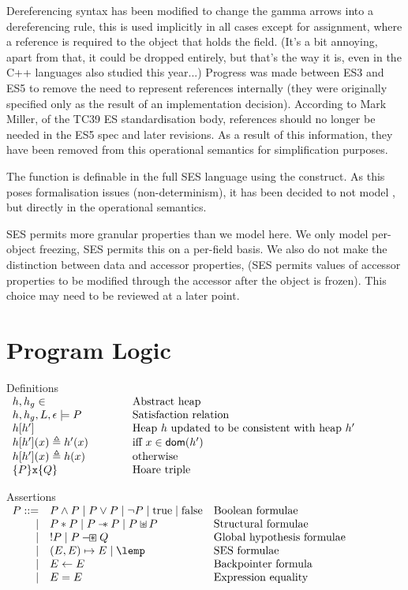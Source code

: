 \documentclass[a4paper]{article}
\begin{document}
Dereferencing syntax has been modified to change the gamma arrows into a
dereferencing rule, this is used implicitly in all cases except for assignment,
where a reference is required to the object that holds the field. (It's a bit
annoying, apart from that, it could be dropped entirely, but that's the way it
is, even in the C++ languages also studied this year...)
Progress was
made between ES3 and ES5 to remove the need to represent references internally
(they were originally specified only as the result of an implementation
decision). According to Mark Miller, of the TC39 ES standardisation body,
references should no longer be needed in the ES5 spec and later revisions. As a
result of this information, they have been removed from this operational
semantics for simplification purposes.

The  function is definable in the full SES language using the
 construct. As this poses formalisation issues (non-determinism),
it has been decided to not model , but  directly in the
operational semantics.

SES permits more granular properties than we model here. We only model
per-object freezing, SES permits this on a per-field basis. We also do not make
the distinction between data and accessor properties, (SES permits values of
accessor properties to be modified through the accessor after the object is
frozen). This choice may need to be reviewed at a later point.

\section{Program Logic}

\newcommand{\defline}[2]{#1 & \qquad & \text{#2}\\}
\begin{display}{Definitions}
  $\begin{array}{lll}
    \defline{h,h_g \in}{Abstract heap}
    \defline{h,h_g,L,\env \satisfies P}{Satisfaction relation}
    \defline{h[h']}{Heap $h$ updated to be consistent with heap $h'$}
    \defline{h[h'](x) \triangleq h'(x)}{iff $x \in \dom(h')$}
    \defline{h[h'](x) \triangleq h(x)}{otherwise}
    \defline{\tr{P}{\js{x}}{Q}}{Hoare triple}
  \end{array}$
\end{display}

\newcommand{\asrtline}[3][\pipe]{#1 & #2 & \text{#3}\\}
\begin{display}{Assertions}
  $\begin{array}{rll}
    \asrtline[P ::=]{P \land P \pipe P \lor P \pipe \lnot P \pipe \true \pipe
    \false}{Boolean formulae}
    \asrtline{P \sep P \pipe P \wand P \pipe P \sepish P}{Structural formulae}
    \asrtline{\upd P \pipe P \boxwand Q}{Global hypothesis formulae}
    \asrtline{(E,E) \pointsto E \pipe \lemp}{SES formulae}
    \asrtline{E \bp E}{Backpointer formula}
    \asrtline{E = E}{Expression equality}
  \end{array}$
\end{display}
\end{document}
